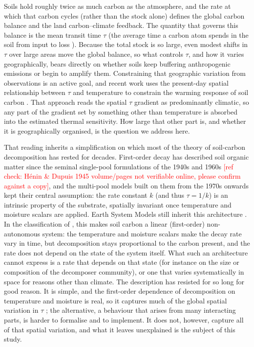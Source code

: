 \documentclass[12pt, a4paper]{article}
\newcommand{\PH}[1]{\textcolor{red}{#1}}
\begin{document}
Soils hold roughly twice as much carbon as the atmosphere, and the rate at which
that carbon cycles (rather than the stock alone) defines the global carbon balance
and the land carbon--climate feedback. The quantity that governs this balance is
the mean transit time $\tau$ (the average time a carbon atom spends in the soil
from input to loss \citep{Sierra2017,Sierra2018}). Because the total stock is so
large, even modest shifts in $\tau$ over large areas move the global balance, so
what controls $\tau$, and how it varies geographically, bears directly on whether
soils keep buffering anthropogenic emissions or begin to amplify them. Constraining
that geographic variation from observations is an active goal, and recent work uses
the present-day spatial relationship between $\tau$ and temperature to constrain the
warming response of soil carbon \citep{Varney2020}. That approach reads the spatial
$\tau$ gradient as predominantly climatic, so any part of the gradient set by
something other than temperature is absorbed into the estimated thermal sensitivity.
How large that other part is, and whether it is geographically organised, is the
question we address here.

That reading inherits a simplification on which most of the theory of soil-carbon
decomposition has rested for decades. First-order decay has described soil organic
matter since the seminal single-pool formulations of the 1940s and 1960s
\citep{Henin1945,Olson1963}\PH{[ref check: H\'enin \& Dupuis 1945 volume/pages not
verifiable online, please confirm against a copy]}, and the multi-pool models built on them from the 1970s
onwards \citep{Jenkinson1990,Parton1987,Coleman1996} kept their central assumption:
the rate constant $k$ (and thus $\tau=1/k$) is an intrinsic property of the
substrate, spatially invariant once temperature and moisture scalars are applied.
Earth System Models still inherit this architecture
\citep{ToddBrown2013,Wieder2013}. In the classification of \citet{SierraMuller2015},
this makes soil carbon a linear (first-order) non-autonomous system: the
temperature and moisture scalars make the decay rate vary in time, but decomposition
stays proportional to the carbon present, and the rate does not depend on the state
of the system itself. What such an architecture cannot express is a rate that
depends on that state (for instance on the size or composition of the decomposer
community), or one that varies systematically in space for reasons other than
climate. The description has resisted for so long 
for good reason. It is simple, and the first-order dependence of decomposition on
temperature and moisture is real, so it captures much of the global spatial
variation in $\tau$ \citep{Davidson2006,Carvalhais2014}; the alternative, a
behaviour that arises from many interacting parts, is harder to
formalise and to implement. It does not, however, capture all of that spatial
variation, and what it leaves unexplained is the subject of this study.
\end{document}
